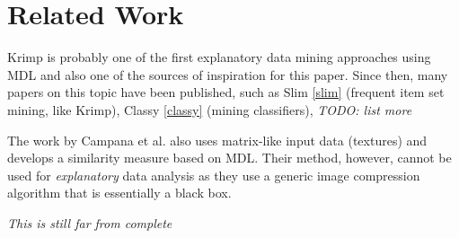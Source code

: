 \documentclass{llncs}
\begin{document}
\section{Related Work}

Krimp \cite{krimp} is probably one of the first explanatory data mining approaches using MDL and also one of the sources of inspiration for this paper. Since then, many papers on this topic have been published, such as Slim \ref{slim} (frequent item set mining, like Krimp), Classy \ref{classy} (mining classifiers), \emph{TODO: list more}

The work by Campana et al. \cite{campana2010compression} also uses matrix-like input data (textures) and develops a similarity measure based on MDL. Their method, however, cannot be used for \emph{explanatory} data analysis as they use a generic image compression algorithm that is essentially a black box.

\emph{This is still far from complete}
\end{document}
